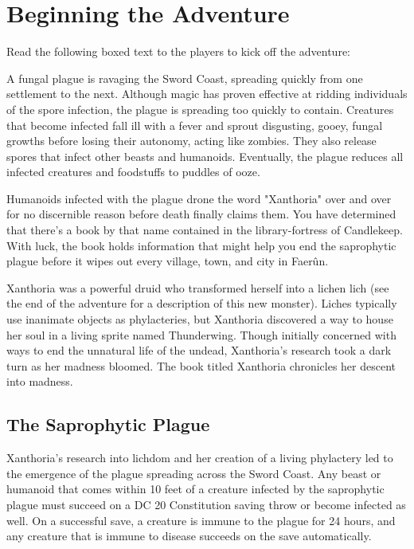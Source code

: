 \documentclass[10pt,a4paper,twoside,bg=print,twocolumn,openany,nodeprecatedcode]{dndbook}
\begin{document}
\section{Beginning the Adventure}
Read the following boxed text to the players to kick off the adventure:

\begin{DndReadAloud}{}
A fungal plague is ravaging the Sword Coast, spreading quickly from one settlement to the next. Although magic has proven effective at ridding individuals of the spore infection, the plague is spreading too quickly to contain. Creatures that become infected fall ill with a fever and sprout disgusting, gooey, fungal growths before losing their autonomy, acting like zombies. They also release spores that infect other beasts and humanoids. Eventually, the plague reduces all infected creatures and foodstuffs to puddles of ooze.

Humanoids infected with the plague drone the word "Xanthoria" over and over for no discernible reason before death finally claims them. You have determined that there's a book by that name contained in the library-fortress of Candlekeep. With luck, the book holds information that might help you end the saprophytic plague before it wipes out every village, town, and city in Faerûn.

\end{DndReadAloud}

Xanthoria was a powerful druid who transformed herself into a lichen lich (see the end of the adventure for a description of this new monster). Liches typically use inanimate objects as phylacteries, but Xanthoria discovered a way to house her soul in a living sprite named Thunderwing. Though initially concerned with ways to end the unnatural life of the undead, Xanthoria's research took a dark turn as her madness bloomed. The book titled Xanthoria chronicles her descent into madness.

\subsection{The Saprophytic Plague}
Xanthoria's research into lichdom and her creation of a living phylactery led to the emergence of the plague spreading across the Sword Coast. Any beast or humanoid that comes within 10 feet of a creature infected by the saprophytic plague must succeed on a DC 20 Constitution saving throw or become infected as well. On a successful save, a creature is immune to the plague for 24 hours, and any creature that is immune to disease succeeds on the save automatically.
\end{document}
